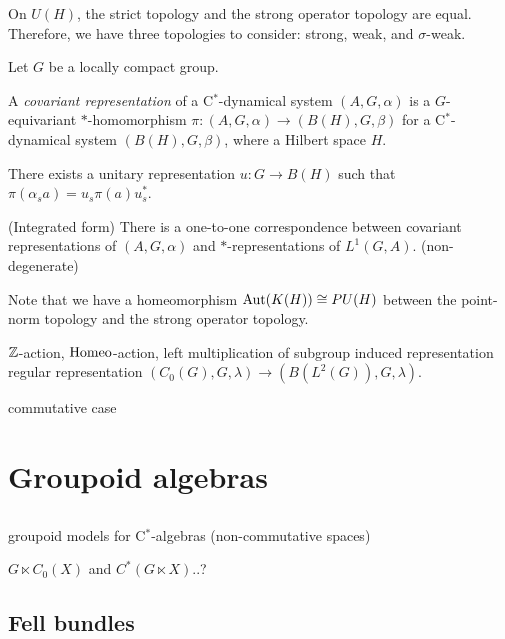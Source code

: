 \documentclass{../../large}
\begin{document}
On $U(H)$, the strict topology and the strong operator topology are equal.
Therefore, we have three topologies to consider: strong, weak, and $\sigma$-weak.

\begin{prb}
Let $G$ be a locally compact group.

A \emph{covariant representation} of a C$^*$-dynamical system $(A,G,\alpha)$ is a $G$-equivariant $*$-homomorphism $\pi:(A,G,\alpha)\to(B(H),G,\beta)$ for a C$^*$-dynamical system $(B(H),G,\beta)$, where a Hilbert space $H$.
\begin{parts}
\item
There exists a unitary representation $u:G\to B(H)$ such that $\pi(\alpha_sa)=u_s\pi(a)u_s^*$.
\item (Integrated form)
There is a one-to-one correspondence between covariant representations of $(A,G,\alpha)$ and $*$-representations of $L^1(G,A)$. (non-degenerate)
\end{parts}
\end{prb}

Note that we have a homeomorphism $\operatorname{Aut}(K(H))\cong PU(H)$ between the point-norm topology and the strong operator topology.

$\mathbb{Z}$-action, $\operatorname{Homeo}$-action, left multiplication of subgroup
induced representation
regular representation $(C_0(G),G,\lambda)\to(B(L^2(G)),G,\lambda)$.


commutative case




\chapter{Groupoid algebras}

\section{}

groupoid models for C$^*$-algebras (non-commutative spaces)

\begin{prb}
$G\ltimes C_0(X)$ and $C^*(G\ltimes X)$..?
\end{prb}

\begin{prb}
\end{prb}

\section{Fell bundles}
\end{document}
